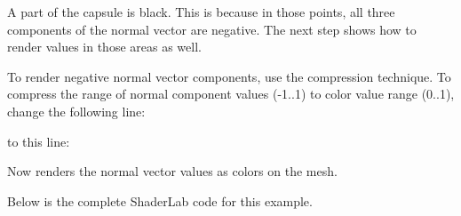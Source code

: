\begin{DoxyEnumerate}
A part of the capsule is black. This is because in those points, all three components of the normal vector are negative. The next step shows how to render values in those areas as well.
\item To render negative normal vector components, use the compression technique. To compress the range of normal component values {\ttfamily (-\/1..1)} to color value range {\ttfamily (0..1)}, change the following line\+:


\begin{DoxyCode}{0}
\DoxyCodeLine{++}

\end{DoxyCode}


to this line\+:


\begin{DoxyCode}{0}
\DoxyCodeLine{++}

\end{DoxyCode}

\end{DoxyEnumerate}

Now  renders the normal vector values as colors on the mesh.



Below is the complete Shader\+Lab code for this example.


